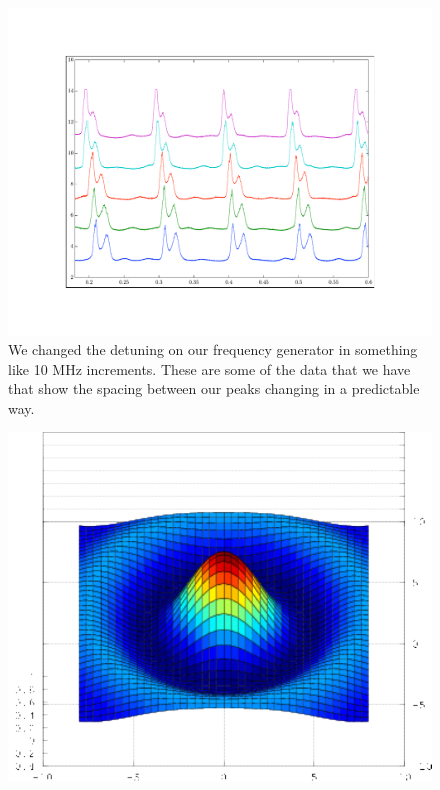  
\begin{figure}
    \centerline{\includegraphics{sampleOffsetData}}
    \caption[]{\label{fig:typicaldata}
    We changed the detuning on our frequency generator in something like 10 MHz increments. These are some of the data that we have that show the spacing between our peaks changing in a predictable way.}
\end{figure}
\begin{figure}
\centerline{\includegraphics{thisone}}
\end{figure}

